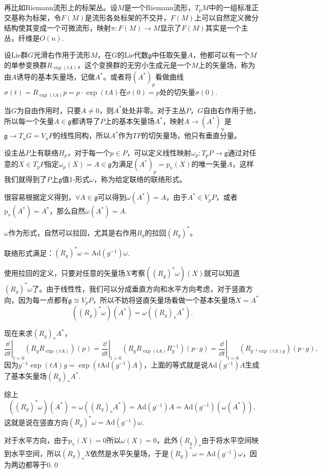 再比如Riemann流形上的标架丛。设$M$是一个Riemann流形，$T_pM$中的一组标准正交基称为标架，令$F(M)$是流形各处标架的不交并，$F(M)$上可以自然定义微分结构使其变成一个可微流形，映射$\pi :F(M)\to M$显示了$F(M)$其实是一个主丛，纤维是$O(n)$.

\para 设Lie群$G$光滑右作用于流形$M$，在$G$的Lie代数$\mathfrak{g}$中任取矢量$A$，他都可以有一个$M$的单参变换群$R_{\exp(tA)}$，这个变换群的无穷小生成元是一个$M$上的矢量场，称为由$A$诱导的基本矢量场，记做$A^*$。或者将$(A^*)_p$看做曲线$\sigma(t)=R_{\exp(tA)}p=p\cdot\exp(tA)$在$\sigma(0)=p$处的切矢量$\dot\sigma(0)$.

当$G$为自由作用时，只要$A\neq 0$，则$A^*$处处非零。对于主丛$P$，$G$自由右作用于他，所以每一个矢量$A\in \mathfrak{g}$都诱导了$P$上的基本矢量场$A^*$，映射$A\to (A^*)_u$是$\mathfrak{g}\to T_uG=V_uP$的线性同构，所以$A^*$作为$TP$的切矢量场，他只有垂直分量。

设主丛$P$上有联络$H_p$，对于每一个$p\in P$，可以定义线性映射$\omega_p:T_p P\to \mathfrak{g}$通过对任意的$X\in T_p P$指定$\omega_p(X)=A\in \mathfrak{g}$为满足$(A^*)_p=\mathrm{p_v}(X)$的唯一矢量$A$，这样我们就得到了$P$上$\mathfrak{g}$值1-形式$\omega$，称为给定联络的联络形式。

很容易根据定义得到，$\forall A\in\mathfrak{g}$可以得到$\omega(A^*)=A$，由于$A^*\in V_pP$，或者$\mathrm{p_v}(A^*)=A^*$，那么自然$\omega(A^*)=A$.

$\omega$作为形式，自然可以拉回，尤其是右作用$R_g$的拉回$(R_g)^*$。

\pro 	联络形式满足：$(R_g)^*\omega=\mathrm{Ad}(g^{-1})\omega$.

\proof 使用拉回的定义，只要对任意的矢量场$X$考察$((R_g)^*\omega)(X)$就可以知道$(R_g)^*\omega$了。由于线性性，我们可以分成垂直方向和水平方向考虑，对于竖直方向，因为每一点都有$\mathfrak{g}\cong V_pP$，所以不妨将竖直矢量场看做一个基本矢量场$X=A^*$
\[
	((R_g)^*\omega)(A^*)=\omega((R_g)_*A^*).
\]

现在来求$(R_g)_*A^*$，
\[
	\left.\frac{\dd}{\dd t}\right|_{t=0}(R_gR_{\exp(tA)})(p)=\left.\frac{\dd}{\dd t}\right|_{t=0}(R_gR_{\exp(tA)}R_g^{-1})(p\cdot g)=\left.\frac{\dd}{\dd t}\right|_{t=0}(R_{g^{-1}\exp(tA)g})(p\cdot g),
\]
因为$g^{-1}\exp(tA)g=\exp(t\mathrm{Ad}(g^{-1})A)$，上面的等式就是说$\mathrm{Ad}(g^{-1})A$生成了基本矢量场$\left(R_g\right)_*A^*$.

综上
\[
	((R_g)^*\omega)(A^*)=\omega((R_g)_*A^*)=\mathrm{Ad}(g^{-1})A=\mathrm{Ad}(g^{-1})(\omega(A^*)),
\]
这就是说在竖直方向$(R_g)^*\omega=\mathrm{Ad}(g^{-1})\omega$.

对于水平方向，由于$\mathrm{p_v}(X)=0$所以$\omega(X)=0$，此外$(R_g)_*$由于将水平空间映到水平空间，所以$(R_g)_*X$依然是水平矢量场，于是$(R_g)^*\omega=\mathrm{Ad}(g^{-1})\omega$，因为两边都等于0.\qed

